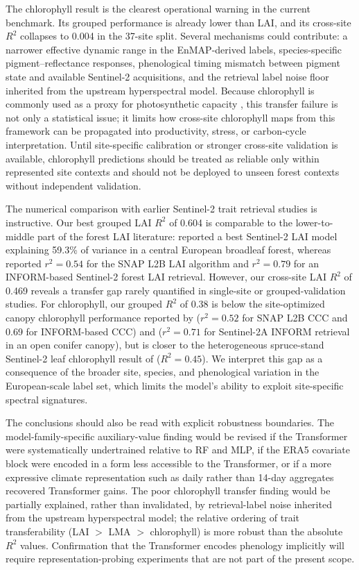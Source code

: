 \documentclass[final,times,onecolumn, authoryear]{elsarticle}
\begin{document}
\begin{linenumbers}
The chlorophyll result is the clearest operational warning in the current benchmark. Its grouped performance is already lower than LAI, and its cross-site $R^2$ collapses to 0.004 in the 37-site split. Several mechanisms could contribute: a narrower effective dynamic range in the EnMAP-derived labels, species-specific pigment--reflectance responses, phenological timing mismatch between pigment state and available Sentinel-2 acquisitions, and the retrieval label noise floor inherited from the upstream hyperspectral model. Because chlorophyll is commonly used as a proxy for photosynthetic capacity \citep{croft2017chlorophyll}, this transfer failure is not only a statistical issue; it limits how cross-site chlorophyll maps from this framework can be propagated into productivity, stress, or carbon-cycle interpretation. Until site-specific calibration or stronger cross-site validation is available, chlorophyll predictions should be treated as reliable only within represented site contexts and should not be deployed to unseen forest contexts without independent validation.

The numerical comparison with earlier Sentinel-2 trait retrieval studies is instructive. Our best grouped LAI $R^2$ of 0.604 is comparable to the lower-to-middle part of the forest LAI literature: \citet{meyer2019landsatSentinel} reported a best Sentinel-2 LAI model explaining 59.3\% of variance in a central European broadleaf forest, whereas \citet{brown2019sentinel2} reported $r^2=0.54$ for the SNAP L2B LAI algorithm and $r^2=0.79$ for an INFORM-based Sentinel-2 forest LAI retrieval. However, our cross-site LAI $R^2$ of 0.469 reveals a transfer gap rarely quantified in single-site or grouped-validation studies. For chlorophyll, our grouped $R^2$ of 0.38 is below the site-optimized canopy chlorophyll performance reported by \citet{brown2019sentinel2} ($r^2=0.52$ for SNAP L2B CCC and 0.69 for INFORM-based CCC) and \citet{zarco2019chlorophyll} ($r^2=0.71$ for Sentinel-2A INFORM retrieval in an open conifer canopy), but is closer to the heterogeneous spruce-stand Sentinel-2 leaf chlorophyll result of \citet{darvishzadeh2019chlorophyll} ($R^2=0.45$). We interpret this gap as a consequence of the broader site, species, and phenological variation in the European-scale label set, which limits the model's ability to exploit site-specific spectral signatures.

The conclusions should also be read with explicit robustness boundaries. The model-family-specific auxiliary-value finding would be revised if the Transformer were systematically undertrained relative to RF and MLP, if the ERA5 covariate block were encoded in a form less accessible to the Transformer, or if a more expressive climate representation such as daily rather than 14-day aggregates recovered Transformer gains. The poor chlorophyll transfer finding would be partially explained, rather than invalidated, by retrieval-label noise inherited from the upstream hyperspectral model; the relative ordering of trait transferability (LAI $>$ LMA $>$ chlorophyll) is more robust than the absolute $R^2$ values. Confirmation that the Transformer encodes phenology implicitly will require representation-probing experiments that are not part of the present scope.


\end{linenumbers}
\end{document}
